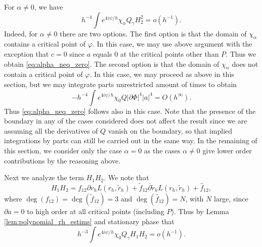 \documentclass[12pt]{amsart}
\def\p{\partial}
\theoremstyle{definition}
\theoremstyle{remark}
\newcommand{\abs}[1]{\lvert #1 \rvert}
\newcommand{\tbl}[1]{\textcolor{blue}{#1}}
\newcommand{\f}[1]{\footnote{\tbl{#1}}}
\newcommand{\op}{\overline \p}
\begin{document}
For $\alpha \neq 0$, we have
\begin{equation}\label{eq:alpha_neq_zero}
 h^{-4}\int e^{4i\psi/h}\chi_\alpha Q_\gamma H_2^2=o(h^{-1}). %
\end{equation}
Indeed, for $\alpha\neq 0$ there are two options. The first option is that  the domain of $\chi_\alpha$  contains a critical point of $\varphi$. In this case, we may use above argument with the exception that $c=0$ since $a$ equals $0$ at the critical points other than $P$. Thus we obtain \eqref{eq:alpha_neq_zero}. The second option is that the domain of $\chi_\alpha$ does not contain a critical point of $\varphi$. In this case, we may proceed as above in this section, but we may integrate parts unrestricted amount of times to obtain
\[
 -h^{-4}\int e^{4i\psi/h} \chi_0 Q\abs{\p \Phi}^4\abs{a}^4 =O(h^\infty).
\]
Thus \eqref{eq:alpha_neq_zero} follows also in this case. Note that the presence of the boundary in any of the cases considered does not affect the result since we are assuming all the derivatives of $Q$ vanish on the boundary, so that implied integrations by parts can still be carried out in the same way. 
% 
In the remaining of this section, we consider only the case $\alpha=0$ as the cases $\alpha\neq 0$ give lower order contributions by the reasoning above.


Next we analyze the term $H_1H_2$. We note that 
\[
 H_1H_2=f_{12}\p r_h L(r_h,\tilde r_h)+\tilde f_{12}\op \tilde r_h L(r_h,\tilde r_h)+\hat f_{12},
\]
where $\deg(f_{12})=\deg(\tilde f_{12})=3$ and $\deg(\hat{f}_{12})=N$, with $N$ large, since $\p a=0$ to high order at all critical points (including $P$). 
Thus by Lemma \ref{lem:polynomial_rh_estims} and stationary phase that
\[
 h^{-3}\int e^{4i\psi/h} \chi_0 Q_\gamma H_1H_2%
 =o(h^{-1}).
\]
\end{document}

